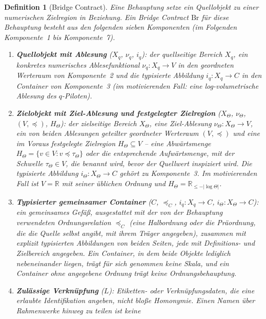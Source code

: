 \documentclass[11pt,a4paper]{article}
\newtheorem{definition}{Definition}[section]
\begin{document}
\begin{definition}[Bridge Contract]\label{def:bridge}
Eine Behauptung setze ein Quellobjekt zu einer numerischen Zielregion in
Beziehung. Ein \emph{Bridge Contract} $\mathrm{Br}$ für diese Behauptung
besteht aus den folgenden sieben Komponenten (im Folgenden
\emph{Komponente~1} bis \emph{Komponente~7}).
\begin{enumerate}
  \item \textbf{Quellobjekt mit Ablesung} ($X_q$, $\nu_q$, $i_q$): der
    quellseitige Bereich $X_q$, ein konkretes numerisches Ablesefunktional
    $\nu_q\colon X_q \to V$ in den geordneten Werteraum von Komponente~2 und
    die typisierte Abbildung $i_q\colon X_q \to C$ in den Container von
    Komponente~3 (im motivierenden Fall: eine log-volumetrische Ablesung des
    $q$-Piloten).
  \item \textbf{Zielobjekt mit Ziel-Ablesung und festgelegter Zielregion}
    ($X_\Theta$, $\nu_\Theta$, $(V,\preceq)$, $H_\Theta$): der zielseitige
    Bereich $X_\Theta$, eine Ziel-Ablesung $\nu_\Theta\colon X_\Theta \to V$,
    ein von beiden Ablesungen geteilter geordneter Werteraum $(V,\preceq)$
    und eine \emph{im Voraus} festgelegte Zielregion $H_\Theta \subseteq V$
    -- eine Abwärtsmenge $H_\Theta = \{v \in V : v \preceq \tau_\Theta\}$
    oder die entsprechende Aufwärtsmenge, mit der Schwelle
    $\tau_\Theta \in V$, die benannt wird, bevor der Quellwert inspiziert
    wird. Die typisierte Abbildung $i_\Theta\colon X_\Theta \to C$ gehört zu
    Komponente~3. Im motivierenden Fall ist $V = \mathbb{R}$ mit seiner
    üblichen Ordnung und $H_\Theta = \mathbb{R}_{\le -|\log\Theta|}$.
  \item \textbf{Typisierter gemeinsamer Container} ($C$, $\preceq_C$,
    $i_q\colon X_q \to C$, $i_\Theta\colon X_\Theta \to C$): ein gemeinsames
    Gefäß, ausgestattet mit der von der Behauptung verwendeten
    Ordnungsrelation $\preceq_C$ (eine Halbordnung oder die Präordnung, die
    die Quelle selbst angibt, mit ihrem Träger angegeben), zusammen mit
    \emph{explizit typisierten} Abbildungen von beiden Seiten, jede mit
    Definitions- und Zielbereich angegeben. Ein Container, in dem beide
    Objekte lediglich nebeneinander liegen, trägt für sich genommen keine
    Skala, und ein Container ohne angegebene Ordnung trägt keine
    Ordnungsbehauptung.
  \item \textbf{Zulässige Verknüpfung} ($L$): Etiketten- oder
    Verknüpfungsdaten, die eine \emph{erlaubte Identifikation} angeben, nicht
    bloße Homonymie. Einen Namen über Rahmenwerke hinweg zu teilen ist keine

\end{enumerate}
\end{definition}
\end{document}
